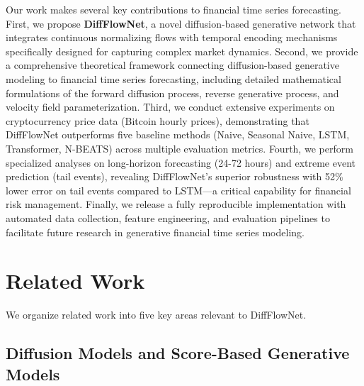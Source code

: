 \documentclass[11pt,a4paper]{article}
\begin{document}
Our work makes several key contributions to financial time series forecasting. First, we propose \textbf{DiffFlowNet}, a novel diffusion-based generative network that integrates continuous normalizing flows with temporal encoding mechanisms specifically designed for capturing complex market dynamics. Second, we provide a comprehensive theoretical framework connecting diffusion-based generative modeling to financial time series forecasting, including detailed mathematical formulations of the forward diffusion process, reverse generative process, and velocity field parameterization. Third, we conduct extensive experiments on cryptocurrency price data (Bitcoin hourly prices), demonstrating that DiffFlowNet outperforms five baseline methods (Naive, Seasonal Naive, LSTM, Transformer, N-BEATS) across multiple evaluation metrics. Fourth, we perform specialized analyses on long-horizon forecasting (24-72 hours) and extreme event prediction (tail events), revealing DiffFlowNet's superior robustness with 52\% lower error on tail events compared to LSTM—a critical capability for financial risk management. Finally, we release a fully reproducible implementation with automated data collection, feature engineering, and evaluation pipelines to facilitate future research in generative financial time series modeling.

\section{Related Work}

We organize related work into five key areas relevant to DiffFlowNet.

\subsection{Diffusion Models and Score-Based Generative Models}
\end{document}
